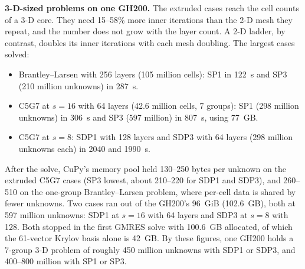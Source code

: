 \textbf{3-D-sized problems on one GH200.} The extruded cases reach the cell
counts of a 3-D core. They need 15--58\% more inner iterations than the 2-D
mesh they repeat, and the number does not grow with the layer count. A 2-D
ladder, by contrast, doubles its inner iterations with each mesh doubling.
The largest cases solved:
\begin{itemize}
\item Brantley--Larsen with 256 layers (105 million cells): SP1 in 122~s
  and SP3 (210 million unknowns) in 287~s.
\item C5G7 at $s = 16$ with 64 layers (42.6 million cells, 7 groups): SP1
  (298 million unknowns) in 306~s and SP3 (597 million) in 807~s, using
  77~GB.
\item C5G7 at $s = 8$: SDP1 with 128 layers and SDP3 with 64 layers (298
  million unknowns each) in 2040 and 1990~s.
\end{itemize}
After the solve, CuPy's memory pool held 130--250 bytes per unknown on the
extruded C5G7 cases (SP3 lowest, about 210--220 for SDP1 and SDP3), and
260--510 on the one-group Brantley--Larsen problem, where per-cell data is
shared by fewer unknowns. Two cases ran out of the GH200's 96~GiB (102.6~GB),
both at 597 million unknowns: SDP1 at $s = 16$ with 64 layers and SDP3 at
$s = 8$ with 128. Both stopped in the first GMRES solve with 100.6~GB
allocated, of which the 61-vector Krylov basis alone is 42~GB. By these
figures, one GH200 holds a 7-group 3-D problem of roughly 450 million
unknowns with SDP1 or SDP3, and 400--800 million with SP1 or SP3.

